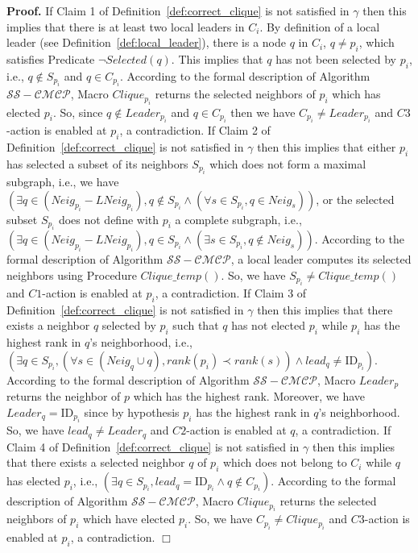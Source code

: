 \documentclass[11pt,letterpaper,onecolumn]{article}
\newenvironment{proof}{\noindent \begin{rm}{\textbf{Proof.} }}{\hspace*{\fill}$\Box$\par\end{rm} \vspace{.3cm}}
\newcommand{\id}{\mbox{ID}}
\begin{document}
\begin{proof}
If Claim 1 of Definition~\ref{def:correct_clique} is not satisfied in $\gamma$ then this implies that there is at least two local leaders in $C_i$. By definition of a local leader (see Definition~\ref{def:local_leader}), there is a node $q$ in $C_i$, $q \neq p_i$, which satisfies Predicate $\neg Selected(q)$. This implies that $q$ has not been selected by $p_i$, i.e., $q \not \in S_{p_i}$ and $q \in C_{p_i}$. According to the formal description of Algorithm $\mathcal{SS-CMCP}$, Macro $Clique_{p_i}$ returns the selected neighbors of $p_i$ which has elected $p_i$. So, since $q \not \in Leader_{p_i}$ and $q \in C_{p_i}$ then we have $C_{p_i} \neq Leader_{p_i}$ and $C3$-action is enabled at $p_i$, a contradiction. If Claim 2 of Definition~\ref{def:correct_clique} is not satisfied in $\gamma$ then this implies that either $p_i$ has selected a subset of its neighbors $S_{p_i}$ which does not form a maximal subgraph, i.e., we have $(\exists q \in (Neig_{p_i}-LNeig_{p_i}), q \not \in S_{p_i} \wedge (\forall s \in S_{p_i}, q \in Neig_s))$, or the selected subset $S_{p_i}$ does not define with $p_i$ a complete subgraph, i.e., $(\exists q \in (Neig_{p_i}-LNeig_{p_i}), q \in S_{p_i} \wedge (\exists s \in S_{p_i}, q \not \in Neig_s))$. According to the formal description of Algorithm $\mathcal{SS-CMCP}$, a local leader computes its selected neighbors using Procedure $Clique\_temp()$. So, we have $S_{p_i} \neq Clique\_temp()$ and $C1$-action is enabled at $p_i$, a contradiction. If Claim 3 of Definition~\ref{def:correct_clique} is not satisfied in $\gamma$ then this implies that there exists a neighbor $q$ selected by $p_i$ such that $q$ has not elected $p_i$ while $p_i$ has the highest rank in $q$'s neighborhood, i.e., $(\exists q \in S_{p_i}, (\forall s \in (Neig_q \cup q), rank(p_i) \prec rank(s)) \wedge lead_q \neq \id_{p_i})$. According to the formal description of Algorithm $\mathcal{SS-CMCP}$, Macro $Leader_p$ returns the neighbor of $p$ which has the highest rank. Moreover, we have $Leader_q = \id_{p_i}$ since by hypothesis $p_i$ has the highest rank in $q$'s neighborhood. So, we have $lead_q \neq Leader_q$ and $C2$-action is enabled at $q$, a contradiction. If Claim 4 of Definition~\ref{def:correct_clique} is not satisfied in $\gamma$ then this implies that there exists a selected neighbor $q$ of $p_i$ which does not belong to $C_i$ while $q$ has elected $p_i$, i.e., $(\exists q \in S_{p_i}, lead_q=\id_{p_i} \wedge q \not \in C_{p_i})$. According to the formal description of Algorithm $\mathcal{SS-CMCP}$, Macro $Clique_{p_i}$ returns the selected neighbors of $p_i$ which have elected $p_i$. So, we have $C_{p_i} \neq Clique_{p_i}$ and $C3$-action is enabled at $p_i$, a contradiction.
\end{proof}
\end{document}
